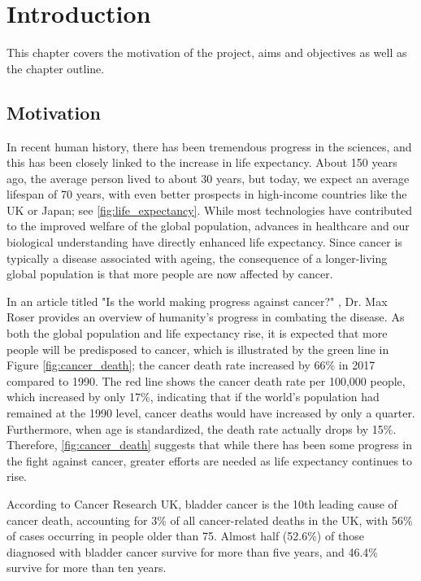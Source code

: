 
\chapter{Introduction}

This chapter covers the motivation of the project, aims and objectives as well as the chapter outline.

\section*{Motivation}

In recent human history, there has been tremendous progress in the sciences, and this has been closely linked to the increase in life expectancy. About 150 years ago, the average person lived to about 30 years, but today, we expect an average lifespan of 70 years, with even better prospects in high-income countries like the UK or Japan; see \cref{fig:life_expectancy}. While most technologies have contributed to the improved welfare of the global population, advances in healthcare and our biological understanding have directly enhanced life expectancy. Since cancer is typically a disease associated with ageing, the consequence of a longer-living global population is that more people are now affected by cancer.

In an article titled "Is the world making progress against cancer?" \citep{World_in_Data_undated-gc}, Dr. Max Roser provides an overview of humanity's progress in combating the disease. As both the global population and life expectancy rise, it is expected that more people will be predisposed to cancer, which is illustrated by the green line in Figure \ref{fig:cancer_death}; the cancer death rate increased by 66\% in 2017 compared to 1990. The red line shows the cancer death rate per 100,000 people, which increased by only 17\%, indicating that if the world's population had remained at the 1990 level, cancer deaths would have increased by only a quarter. Furthermore, when age is standardized, the death rate actually drops by 15\%. Therefore, \cref{fig:cancer_death} suggests that while there has been some progress in the fight against cancer, greater efforts are needed as life expectancy continues to rise.

According to Cancer Research UK\cite{Cancer_Research_UK2015-cf}, bladder cancer is the 10th leading cause of cancer death, accounting for 3\% of all cancer-related deaths in the UK, with 56\% of cases occurring in people older than 75. Almost half (52.6\%) of those diagnosed with bladder cancer survive for more than five years, and 46.4\% survive for more than ten years.

